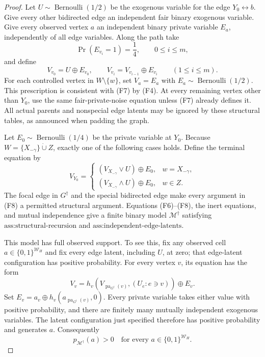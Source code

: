 \documentclass{article}
\begin{document}
\begin{proof}
Let \(U\sim\operatorname{Bernoulli}(1/2)\) be the exogenous variable for the edge \(Y_0\leftrightarrow b\).  Give every other bidirected edge an independent fair binary exogenous variable.  Give every observed vertex \(a\) an independent binary private variable \(E_a\), independently of all edge variables.  Along the path take
\[
\Pr(E_{v_i}=1)=\frac14,
\qquad 0\le i\le m,
\tag{F6}
\]
and define
\[
V_{v_0}=U\mathbin\oplus E_{v_0},
\qquad
V_{v_i}=V_{v_{i-1}}\mathbin\oplus E_{v_i}\qquad(1\le i\le m).
\tag{F7}
\]
For each controlled vertex in \(W\setminus\{w\}\), set \(V_a=E_a\) with \(E_a\sim\operatorname{Bernoulli}(1/2)\).  This prescription is consistent with (F7) by (F4).  At every remaining vertex other than \(Y_0\), use the same fair-private-noise equation unless (F7) already defines it.  All actual parents and nonspecial edge latents may be ignored by these structural tables, as announced when padding the graph.

Let \(E_0\sim\operatorname{Bernoulli}(1/4)\) be the private variable at \(Y_0\).  Because \(W=\{X_{-\gamma}\}\mathbin{\dot\cup}Z\), exactly one of the following cases holds.  Define the terminal equation by
\[
V_{Y_0}=
\begin{cases}
(V_{X_{-\gamma}}\mathbin\vee U)\mathbin\oplus E_0,
&w=X_{-\gamma},\\[2mm]
(V_{X_{-\gamma}}\mathbin\wedge U)\mathbin\oplus E_0,
&w\in Z.
\end{cases}
\tag{F8}
\]
The focal edge in \(G^{\dagger}\) and the special bidirected edge make every argument in (F8) a permitted structural argument.  Equations (F6)--(F8), the inert equations, and mutual independence give a finite binary model \(\mathcal M^{\dagger}\) satisfying \(\text{ass:structural-recursion}\) and \(\text{ass:independent-edge-latents}\).

This model has full observed support.  To see this, fix any observed cell \(a\in\{0,1\}^{\mathcal W_H}\) and fix every edge latent, including \(U\), at zero; that edge-latent configuration has positive probability.  For every vertex \(v\), its equation has the form
\[
V_v=h_v(V_{\operatorname{pa}_{G^{\dagger}}(v)},(U_e:e\ni v))\mathbin\oplus E_v.
\tag{F9}
\]
Set \(E_v=a_v\mathbin\oplus h_v(a_{\operatorname{pa}_{G^{\dagger}}(v)},0)\).  Every private variable takes either value with positive probability, and there are finitely many mutually independent exogenous variables.  The latent configuration just specified therefore has positive probability and generates \(a\).  Consequently
\[
p_{\mathcal M^{\dagger}}(a)>0
\quad\text{for every }a\in\{0,1\}^{\mathcal W_H}.
\tag{F10}
\]


\end{proof}
\end{document}
